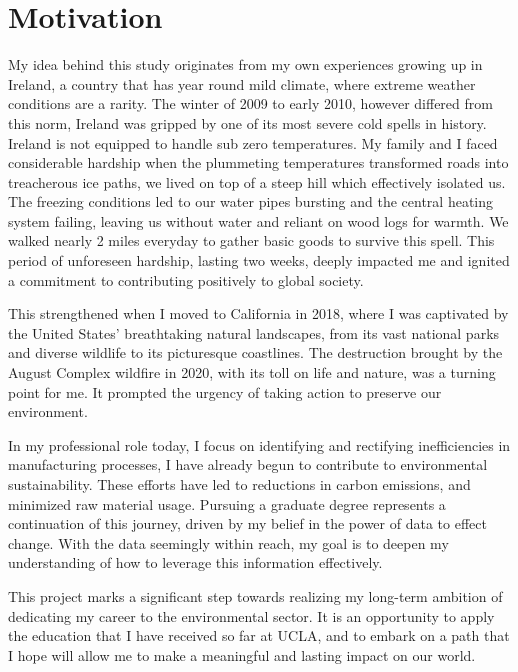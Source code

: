 \section{Motivation}

My idea behind this study originates from my own experiences growing up in Ireland, a country that has year round mild climate, where extreme weather conditions are a rarity. The winter of 2009 to early 2010, however differed from this norm, Ireland was gripped by one of its most severe cold spells in history. Ireland is not equipped to handle sub zero temperatures. My family and I faced considerable hardship when the plummeting temperatures transformed roads into treacherous ice paths, we lived on top of a steep hill which effectively isolated us. The freezing conditions led to our water pipes bursting and the central heating system failing, leaving us without water and reliant on wood logs for warmth. We walked nearly 2 miles everyday to gather basic goods to survive this spell. This period of unforeseen hardship, lasting two weeks, deeply impacted me and ignited a commitment to contributing positively to global society.

This strengthened when I moved to California in 2018, where I was captivated by the United States' breathtaking natural landscapes, from its vast national parks and diverse wildlife to its picturesque coastlines. The destruction brought by the August Complex wildfire in 2020, with its toll on life and nature, was a turning point for me. It prompted the urgency of taking action to preserve our environment.

In my professional role today, I focus on identifying and rectifying inefficiencies in manufacturing processes, I have already begun to contribute to environmental sustainability. These efforts have led to reductions in carbon emissions, and minimized raw material usage. Pursuing a graduate degree represents a continuation of this journey, driven by my belief in the power of data to effect change. With the data seemingly within reach, my goal is to deepen my understanding of how to leverage this information effectively.

This project marks a significant step towards realizing my long-term ambition of dedicating my career to the environmental sector. It is an opportunity to apply the education that I have received so far at UCLA, and to embark on a path that I hope will allow me to make a meaningful and lasting impact on our world.